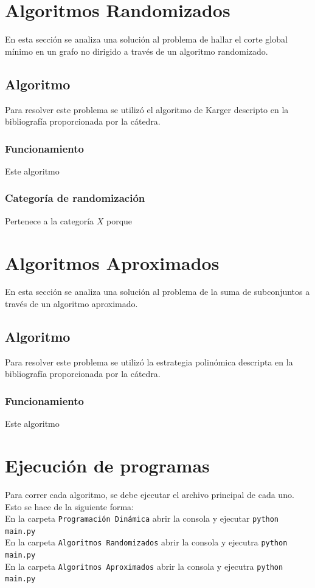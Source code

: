 \documentclass[a4paper, 10pt]{article}
\def\code#1{\texttt{#1}}
\newcommand\tab[1][0.5cm]{\hspace*{#1}}
\begin{document}
\section{Algoritmos Randomizados}
\tab En esta sección se analiza una solución al problema de hallar el corte global
mínimo en un grafo no dirigido a través de un algoritmo randomizado.
\subsection{Algoritmo}
\tab Para resolver este problema se utilizó el algoritmo de Karger descripto en
la bibliografía proporcionada por la cátedra.
\subsubsection{Funcionamiento}
\tab Este algoritmo %
\subsubsection{Categoría de randomización}
\tab Pertenece a la categoría $X$ porque %
\newpage

\section{Algoritmos Aproximados}
\tab En esta sección se analiza una solución al problema de la suma de subconjuntos
a través de un algoritmo aproximado.
\subsection{Algoritmo}
\tab Para resolver este problema se utilizó la estrategia polinómica descripta en
la bibliografía proporcionada por la cátedra.
\subsubsection{Funcionamiento}
\tab Este algoritmo %
\newpage

\section{Ejecución de programas}
\tab Para correr cada algoritmo, se debe ejecutar el archivo principal de cada uno.
Esto se hace de la siguiente forma: \\
\tab\tab En la carpeta \code{Programación Dinámica} abrir la consola y ejecutar \code{python main.py} \\
\tab\tab En la carpeta \code{Algoritmos Randomizados} abrir la consola y ejecutra \code{python main.py} \\
\tab\tab En la carpeta \code{Algoritmos Aproximados} abrir la consola y ejecutra \code{python main.py} \\

\end{document}

